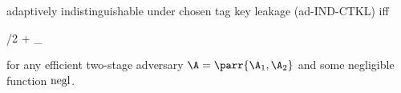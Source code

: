 \begin{definition}
\begin{sitemize}
        \item adaptively indistinguishable under chosen tag key leakage (ad-IND-CTKL) iff
        \begin{bralign}
            /2 + \varepsilon_{}\parr{\secpar}
        \end{bralign}
    \end{sitemize}
    for any efficient two-stage adversary \(\A = \parr{\A_1, \A_2}\) and some negligible function \(\operatorname{negl}\).
\end{definition}

